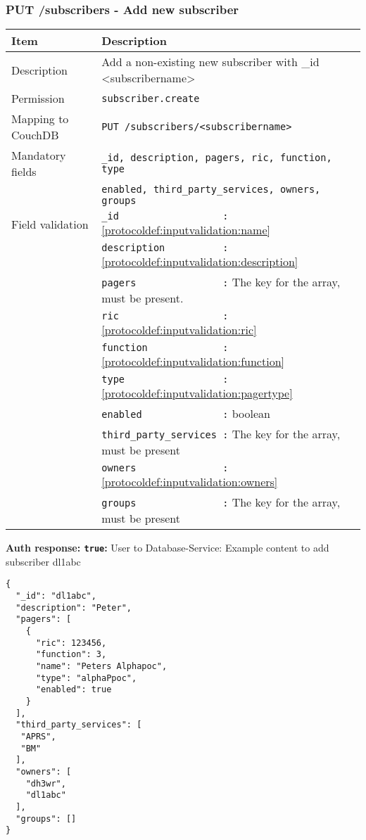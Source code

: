 \subsubsection{PUT /subscribers - Add new subscriber}
\begin{table}[htbp]
  \begin{tabular}{|l|p{12cm}|} \hline
    Item               & Description  \\ \hline \hline
    Description        & Add a non-existing new subscriber with \_id <subscribername>\\ \hline
    Permission         & \verb|subscriber.create| \\ \hline
    Mapping to CouchDB & \verb|PUT /subscribers/<subscribername>|\\ \hline
    Mandatory fields   & \verb|_id, description, pagers, ric, function, type| \\
                       & \verb|enabled, third_party_services, owners, groups| \\ \hline
    Field validation   & \verb|_id                  :| \ref{protocoldef:inputvalidation:name} \\
                       & \verb|description          :| \ref{protocoldef:inputvalidation:description}\\
                       & \verb|pagers               :| The key for the array, must be present.\\
                       & \verb|ric                  :| \ref{protocoldef:inputvalidation:ric} \\
                       & \verb|function             :| \ref{protocoldef:inputvalidation:function} \\
                       & \verb|type                 :| \ref{protocoldef:inputvalidation:pagertype} \\
                       & \verb|enabled              :|  boolean \\
                       & \verb|third_party_services :| The key for the array, must be present \\
                       & \verb|owners               :| \ref{protocoldef:inputvalidation:owners} \\
                       & \verb|groups               :| The key for the array, must be present \\ \hline
  \end{tabular}
\end{table}

\textbf{Auth response: \texttt{true}:}
User to Database-Service: Example content to add subscriber dl1abc
\begin{lstlisting}
{
  "_id": "dl1abc",
  "description": "Peter",
  "pagers": [
    {
      "ric": 123456,
      "function": 3,
      "name": "Peters Alphapoc",
      "type": "alphaPpoc",
      "enabled": true
    }
  ],
  "third_party_services": [
   "APRS",
   "BM"
  ],
  "owners": [
    "dh3wr",
    "dl1abc"
  ],
  "groups": []
}
\end{lstlisting}

